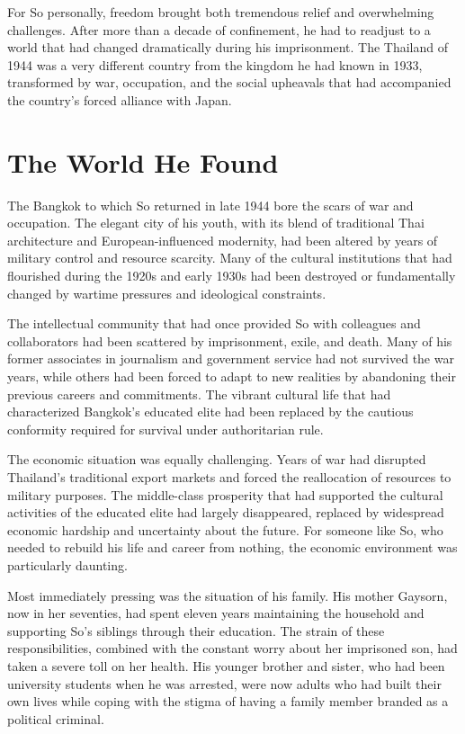 \documentclass[
  Letterpaper,
]{scrbook}
\begin{document}
For So personally, freedom brought both tremendous relief and
overwhelming challenges. After more than a decade of confinement, he had
to readjust to a world that had changed dramatically during his
imprisonment. The Thailand of 1944 was a very different country from the
kingdom he had known in 1933, transformed by war, occupation, and the
social upheavals that had accompanied the country's forced alliance with
Japan.

\section{The World He Found}\label{the-world-he-found}

The Bangkok to which So returned in late 1944 bore the scars of war and
occupation. The elegant city of his youth, with its blend of traditional
Thai architecture and European-influenced modernity, had been altered by
years of military control and resource scarcity. Many of the cultural
institutions that had flourished during the 1920s and early 1930s had
been destroyed or fundamentally changed by wartime pressures and
ideological constraints.

The intellectual community that had once provided So with colleagues and
collaborators had been scattered by imprisonment, exile, and death. Many
of his former associates in journalism and government service had not
survived the war years, while others had been forced to adapt to new
realities by abandoning their previous careers and commitments. The
vibrant cultural life that had characterized Bangkok's educated elite
had been replaced by the cautious conformity required for survival under
authoritarian rule.

The economic situation was equally challenging. Years of war had
disrupted Thailand's traditional export markets and forced the
reallocation of resources to military purposes. The middle-class
prosperity that had supported the cultural activities of the educated
elite had largely disappeared, replaced by widespread economic hardship
and uncertainty about the future. For someone like So, who needed to
rebuild his life and career from nothing, the economic environment was
particularly daunting.

Most immediately pressing was the situation of his family. His mother
Gaysorn, now in her seventies, had spent eleven years maintaining the
household and supporting So's siblings through their education. The
strain of these responsibilities, combined with the constant worry about
her imprisoned son, had taken a severe toll on her health. His younger
brother and sister, who had been university students when he was
arrested, were now adults who had built their own lives while coping
with the stigma of having a family member branded as a political
criminal.
\end{document}
